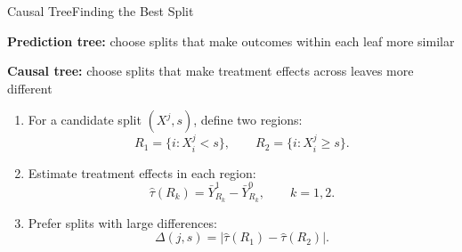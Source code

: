 \documentclass[hyperref={pdfpagelabels=false}]{beamer}
\begin{document}
\begin{frame}{Causal Tree}{Finding the Best Split}

\textbf{Prediction tree:} choose splits that make outcomes within each leaf more similar 


\vspace{0.2cm}

\textbf{Causal tree:} choose splits that make treatment effects across leaves more different


\vspace{0.25cm}
\begin{enumerate}
  \item For a candidate split $(X^j,s)$, define two regions:
  \[
    R_1=\{i:X_i^j<s\}, \qquad R_2=\{i:X_i^j\geq s\}.
  \]
  \vspace{0.1cm}
  \item Estimate treatment effects in each region:
  \[
    \hat{\tau}(R_k)=\bar{Y}^{1}_{R_k}-\bar{Y}^{0}_{R_k}, \qquad k=1,2.
  \]
  \vspace{0.1cm}
  \item Prefer splits with large differences:
  \[
    \Delta(j,s)=\left|\hat{\tau}(R_1)-\hat{\tau}(R_2)\right|.
  \]
\end{enumerate}

\end{frame}
\end{document}
